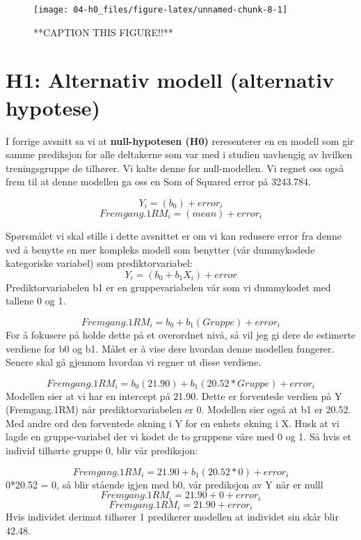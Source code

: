 \documentclass[
]{book}
\begin{document}
\begin{figure}

{\centering \texttt{[image: 04-h0\_files/figure-latex/unnamed-chunk-8-1]} 

}

\caption{**CAPTION THIS FIGURE!!**}\label{fig:unnamed-chunk-8}
\end{figure}

\hypertarget{h1-alternativ-modell-alternativ-hypotese}{%
\section{H1: Alternativ modell (alternativ hypotese)}\label{h1-alternativ-modell-alternativ-hypotese}}

I forrige avsnitt sa vi at \textbf{null-hypotesen (H0)} reresenterer en en modell som gir samme prediksjon for alle deltakerne som var med i studien uavhengig av hvilken treningsgruppe de tilhører. Vi kalte denne for null-modellen. Vi regnet oss også frem til at denne modellen ga oss en Som of Squared error på 3243.784.

\[
Y_i = (b_0) + error_i
\]
\[
Fremgang.1RM_i = (mean) + error_i
\]

Spørsmålet vi skal stille i dette avsnittet er om vi kan redusere error fra denne ved å benytte en mer kompleks modell som benytter (vår dummykodede kategoriske variabel) som prediktorvariabel:
\[
Y_i = (b_0 + b_1X_i) + error
\]
Prediktorvariabelen b1 er en gruppevariabelen vår som vi dummykodet med tallene 0 og 1.

\[
Fremgang.1RM_i = b_0 + b_1(Gruppe) + error_i
\]
For å fokusere på holde dette på et overordnet nivå, så vil jeg gi dere de estimerte verdiene for b0 og b1. Målet er å vise dere hvordan denne modellen fungerer. Senere skal gå gjennom hvordan vi regner ut disse verdiene.

\[
Fremgang.1RM_i = b_0(21.90) + b_1(20.52*Gruppe) + error_i
\]
Modellen sier at vi har en intercept på 21.90. Dette er forventede verdien på Y (Fremgang.1RM) når prediktorvariabelen er 0. Modellen sier også at b1 er 20.52. Med andre ord den forventede økning i Y for en enhets økning i X. Husk at vi lagde en gruppe-variabel der vi kodet de to gruppene våre med 0 og 1. Så hvis et individ tilhørte gruppe 0, blir vår prediksjon:

\[
Fremgang.1RM_i = 21.90 + b_1(20.52*0) + error_i
\]
0*20.52 = 0, så blir stående igjen med b0, vår prediksjon av Y når er nulll
\[
Fremgang.1RM_i = 21.90 + 0 + error_i
\]
\[
Fremgang.1RM_i = 21.90 + error_i
\]
Hvis individet derimot tilhører 1 predikerer modellen at individet sin skår blir 42.48.
\end{document}
